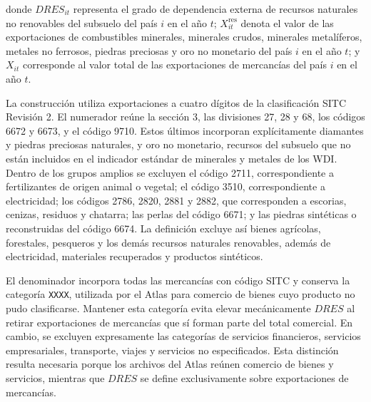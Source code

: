\documentclass[../../TFM.tex]{subfiles}
\begin{document}
	donde $DRES_{it}$ representa el grado de dependencia externa de recursos
	naturales no renovables del subsuelo del país $i$ en el año $t$;
	$X^{\text{res}}_{it}$ denota el valor de las exportaciones de combustibles
	minerales, minerales crudos, minerales metalíferos, metales no ferrosos,
	piedras preciosas y oro no monetario del país $i$ en el año $t$; y
	$X_{it}$ corresponde al valor total de las exportaciones de mercancías del
	país $i$ en el año $t$.

	La construcción utiliza exportaciones a cuatro dígitos de la clasificación
	SITC Revisión 2. El numerador reúne la sección 3, las divisiones 27, 28 y 68,
	los códigos 6672 y 6673, y el código 9710. Estos últimos incorporan
	explícitamente diamantes y piedras preciosas naturales, y oro no monetario,
	recursos del subsuelo que no están incluidos en el indicador estándar de
	minerales y metales de los WDI. Dentro de los grupos amplios se excluyen el
	código 2711, correspondiente a fertilizantes de origen animal o vegetal; el
	código 3510, correspondiente a electricidad; los códigos 2786, 2820, 2881 y
	2882, que corresponden a escorias, cenizas, residuos y chatarra; las perlas
	del código 6671; y las piedras sintéticas o reconstruidas del código 6674. La
	definición excluye así bienes agrícolas, forestales, pesqueros y los demás
	recursos naturales renovables, además de electricidad, materiales recuperados
	y productos sintéticos.

	El denominador incorpora todas las mercancías con código SITC y conserva la
	categoría \texttt{XXXX}, utilizada por el Atlas para comercio de bienes cuyo
	producto no pudo clasificarse. Mantener esta categoría evita elevar
	mecánicamente $DRES$ al retirar exportaciones de mercancías que sí forman parte
	del total comercial. En cambio, se excluyen expresamente las categorías de
	servicios financieros, servicios empresariales, transporte, viajes y servicios
	no especificados. Esta distinción resulta necesaria porque los archivos del
	Atlas reúnen comercio de bienes y servicios, mientras que $DRES$ se define
	exclusivamente sobre exportaciones de mercancías.
\end{document}
